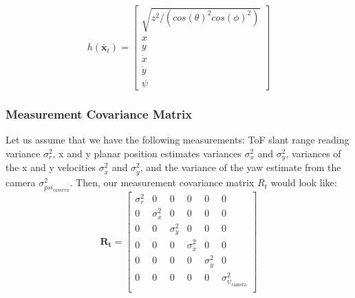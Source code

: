 \documentclass{article}
\begin{document}
\begin{equation}
  h(\mathbf{\bar x}_t) = \begin{bmatrix}
\sqrt{z^2/(cos(\theta)^2cos(\phi)^2)} \\
x \\
y \\
\dot x \\
\dot y \\
\psi
  \end{bmatrix}
\end{equation}

\subsubsection{Measurement Covariance Matrix}
Let us assume that we have the following measurements: ToF slant range reading variance $\sigma_r^2$, x and y planar position estimates variances $\sigma_x^2$ and $\sigma_y^2$, variances of the x and y velocities $\sigma_{\dot x}^2$ and $\sigma_{\dot y}^2$, and the variance of the yaw estimate from the camera $\sigma^2_{psi_\textit{camera}}$. Then, our measurement covariance matrix $R_t$ would look like:
\begin{equation}
\mathbf{R_t} = \begin{bmatrix}
\sigma_r^2 & 0 & 0 & 0 & 0 & 0 \\
0 & \sigma_x^2 & 0 & 0 & 0 & 0 \\
0 & 0 & \sigma_y^2 & 0 & 0 & 0 \\
0 & 0 & 0 & \sigma_{\dot{x}}^2 & 0 & 0 \\
0 & 0 & 0 & 0 & \sigma_{\dot{y}}^2 & 0 \\
0 & 0 & 0 & 0 & 0 & \sigma_{\psi_{\text{camera}}}^2 \\
\end{bmatrix}
\end{equation}
\end{document}
